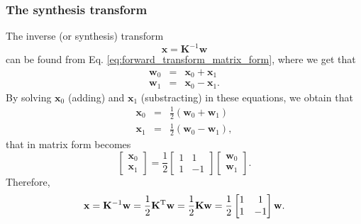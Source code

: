 \subsubsection{The synthesis transform}
The inverse (or synthesis) transform
\begin{equation}
  {\mathbf x} = {\mathbf K}^{-1}{\mathbf w}
  \label{eq:inverse_transform}
\end{equation}
can be found from Eq. \ref{eq:forward_transform_matrix_form}, where we
get that
\begin{equation}
  \begin{array}{rcl}
  {\mathbf w}_0 & = & {\mathbf x}_0 + {\mathbf x}_1\\
  {\mathbf w}_1 & = & {\mathbf x}_0 - {\mathbf x}_1.
  \end{array}
\end{equation}
By solving ${\mathbf x}_0$ (adding) and ${\mathbf x}_1$ (substracting) in
these equations, we obtain that
\begin{equation}
  \begin{array}{rcl}
  {\mathbf x}_0 & = & \frac{1}{2}({\mathbf w}_0 + {\mathbf w}_1)\\
  {\mathbf x}_1 & = & \frac{1}{2}({\mathbf w}_0 - {\mathbf w}_1),
  \end{array}
\end{equation}
that in matrix form becomes
\begin{equation}
  \begin{bmatrix}
    {\mathbf x}_0 \\
    {\mathbf x}_1
  \end{bmatrix}
  = \frac{1}{2}
  \begin{bmatrix} 1 & 1 \\ 1 & -1 \end{bmatrix}
  \begin{bmatrix}
    {\mathbf w}_0 \\
    {\mathbf w}_1
  \end{bmatrix}.
\end{equation}
Therefore,
\begin{equation}
  {\mathbf x} = {\mathbf K}^{-1}{\mathbf w} = \frac{1}{2}{\mathbf K}^{\text T}{\mathbf w} = \frac{1}{2}{\mathbf K}{\mathbf w} = \frac{1}{2}\begin{bmatrix} 1 & 1 \\ 1 & -1 \end{bmatrix}{\mathbf w}.
  \label{eq:inverse_transform_matrix_form}
\end{equation}

